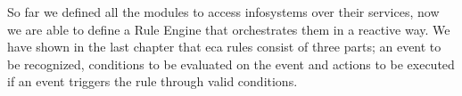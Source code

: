 So far we defined all the modules to access \textrm{\glspl{infosystem}} over their services, now we are able to define a \textrm{Rule Engine} that orchestrates them in a reactive way.
We have shown in the last chapter that \textrm{\acrshort{eca}} rules consist of three parts; an event to be recognized, conditions to be evaluated on the event and actions to be executed if an event triggers the rule through valid conditions.








